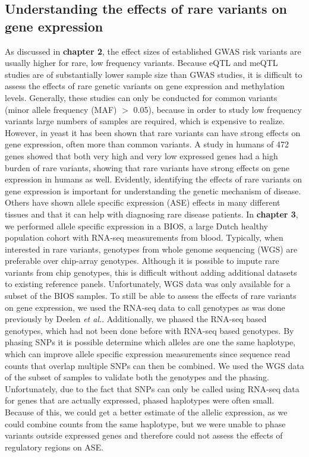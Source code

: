 \subsection{Understanding the effects of rare variants on gene expression}
As discussed in \textbf{chapter 2}, the effect sizes of established GWAS risk variants are usually higher for rare, low frequency variants. Because eQTL and meQTL studies are of substantially lower sample size than GWAS studies, it is difficult to assess the effects of rare genetic variants on gene expression and methylation levels. Generally, these studies can only be conducted for common variants (minor allele frequency (MAF) $>$ 0.05), because in order to study low frequency variants large numbers of samples are required, which is expensive to realize. However, in yeast it has been shown that rare variants can have strong effects on gene expression, often more than common variants\cite{bloomRareVariantsContribute2019}. A study in humans of 472 genes showed that both very high and very low expressed genes had a high burden of rare variants\cite{zhaoBurdenRareVariants2016}, showing that rare variants have strong effects on gene expression in humans as well. Evidently, identifying the effects of rare variants on gene expression is important for understanding the genetic mechanism of disease. Others have shown allele specific expression (ASE) effects in many different tissues\cite{castelVastResourceAllelic2020} and that it can help with diagnosing rare disease patients\cite{mohammadiGeneticRegulatoryVariation2019a}. In \textbf{chapter 3}, we performed allele specific expression in a BIOS, a large Dutch healthy population cohort with RNA-seq measurements from blood. Typically, when interested in rare variants, genotypes from whole genome sequencing (WGS) are preferable over chip-array genotypes. Although it is possible to impute rare variants from chip genotypes, this is difficult without adding additional datasets to existing reference panels\cite{hoffmannStrategiesImputingAnalyzing2015}. Unfortunately, WGS data was only available for a subset of the BIOS samples. To still be able to assess the effects of rare variants on gene expression, we used the RNA-seq data to call genotypes as was done previously by Deelen \emph{et al.}\cite{deelenCallingGenotypesPublic2015b}. Additionally, we phased the RNA-seq based genotypes, which had not been done before with RNA-seq based genotypes. By phasing SNPs it is possible determine which alleles are one the same haplotype, which can improve allele specific expression measurements since sequence read counts that overlap multiple SNPs can then be combined. We used the WGS data of the subset of samples to validate both the genotypes and the phasing. Unfortunately, due to the fact that SNPs can only be called using RNA-seq data for genes that are actually expressed, phased haplotypes were often small. Because of this, we could get a better estimate of the allelic expression, as we could combine counts from the same haplotype, but we were unable to phase variants outside expressed genes and therefore could not assess the effects of regulatory regions on ASE.

